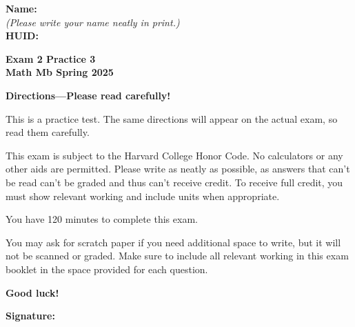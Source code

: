 \documentclass{article}
\begin{document}
{\large \mbox{} \hfill \bf Name:\underline{\hspace{3in}}}\\[2pt]
{\mbox{} \hfill \it (Please write your name neatly in print.)}\\[12pt]
{\large \mbox{} \hfill \bf HUID:\underline{\hspace{3in}}}
 
\medskip
 
\noindent
{\large\bf
Exam 2 Practice 3\\
Math Mb Spring 2025}
\noindent


{\Large
\begin{center}\textbf{Directions---Please read carefully!} \end{center}}

This is a practice test. The same directions will appear on the actual exam, so read them carefully.

\hrulefill 


This exam is subject to the Harvard College Honor Code. No calculators or any other aids are permitted.  Please write as neatly as possible, as answers that can't be read can't be graded and thus can't receive credit. To receive full credit, you must show relevant working
and include units when appropriate. 

You have 120 minutes to complete this exam. 

You may ask for scratch paper if you need additional space to write, but it will not be scanned or graded. Make sure to include all relevant working in this exam booklet in the space provided for each question.

\begin{center}\textbf{Good luck!}\end{center}


\vfill

\vspace{0.3in}

{\large \mbox{} \hfill \bf Signature:\underline{\hspace{3in}}}
\thispagestyle{empty}

\newpage
\end{document}
